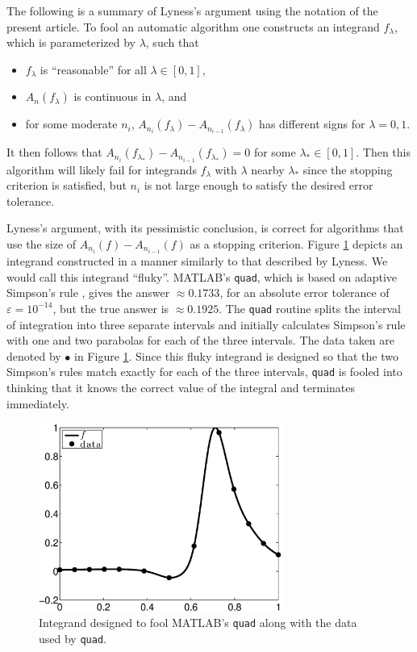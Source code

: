 \documentclass[]{elsarticle}
\theoremstyle{definition}
\theoremstyle{remark}
\begin{document}
The following is a summary of Lyness's argument using the notation of the present article. To fool an automatic algorithm one constructs an integrand $f_\lambda$, which is parameterized by $\lambda$, such that 
\begin{itemize}
\item $f_\lambda$ is ``reasonable'' for all $\lambda \in [0,1]$,
\item $A_n(f_\lambda)$ is continuous in $\lambda$, and 
\item for some moderate $n_i$, $A_{n_{i}}(f_\lambda)-A_{n_{i-1}}(f_\lambda)$ has different signs for $\lambda=0,1$.  
\end{itemize}
It then follows that $A_{n_{i}}(f_{\lambda_*})-A_{n_{i-1}}(f_{\lambda_*})=0$ for some $\lambda_* \in [0,1]$.  Then this algorithm will likely fail for integrands $f_{\lambda}$ with $\lambda$ nearby $\lambda_*$ since the stopping criterion is satisfied, but $n_i$ is not large enough to satisfy the desired error tolerance.

Lyness's argument, with its pessimistic conclusion, is correct for algorithms that use the size of $A_{n_{i}}(f)-A_{n_{i-1}}(f)$ as a stopping criterion.  Figure \ref{fig:foolquad} depicts an integrand constructed in a manner similarly to that described by Lyness.  We would call this integrand ``fluky''.  MATLAB's {\tt quad}, which is based on adaptive Simpson's rule  \citep{GanGau00a}, gives the answer $\approx 0.1733$, for an absolute error tolerance of $\varepsilon=10^{-14}$, but the true answer is $\approx 0.1925$.  The {\tt quad} routine splits the interval of integration into three separate intervals and initially calculates Simpson's rule with one and two parabolas for each of the three intervals.  The data taken are denoted by $\bullet$ in Figure \ref{fig:foolquad}.  Since this fluky integrand is designed so that the two Simpson's rules match exactly for each of the three intervals, {\tt quad} is fooled into thinking that it knows the correct value of the integral and terminates immediately.

\begin{figure}
\centering 
\includegraphics[width=8cm]{foolbwquadexample.eps}
\caption{Integrand designed to fool MATLAB's {\tt quad} along with the data used by {\tt quad}. \label{fig:foolquad}}
\end{figure}
\end{document}
